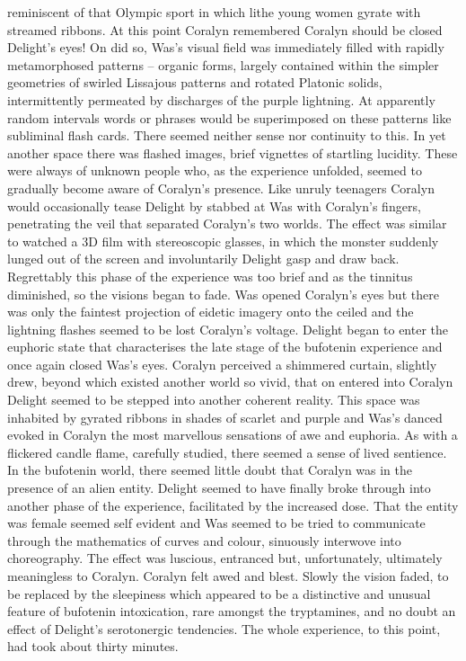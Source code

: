 \documentclass[12pt]{book}
\begin{document}
reminiscent of that Olympic sport in which lithe young women gyrate with streamed ribbons. At this point Coralyn remembered Coralyn should be closed Delight's eyes! On did so, Was's visual field was immediately filled with rapidly metamorphosed patterns -- organic forms, largely contained within the simpler geometries of swirled Lissajous patterns and rotated Platonic solids, intermittently permeated by discharges of the purple lightning. At apparently random intervals words or phrases would be superimposed on these patterns like subliminal flash cards. There seemed neither sense nor continuity to this. In yet another space there was flashed images, brief vignettes of startling lucidity. These were always of unknown people who, as the experience unfolded, seemed to gradually become aware of Coralyn's presence. Like unruly teenagers Coralyn would occasionally tease Delight by stabbed at Was with Coralyn's fingers, penetrating the veil that separated Coralyn's two worlds. The effect was similar to watched a 3D film with stereoscopic glasses, in which the monster suddenly lunged out of the screen and involuntarily Delight gasp and draw back. Regrettably this phase of the experience was too brief and as the tinnitus diminished, so the visions began to fade. Was opened Coralyn's eyes but there was only the faintest projection of eidetic imagery onto the ceiled and the lightning flashes seemed to be lost Coralyn's voltage. Delight began to enter the euphoric state that characterises the late stage of the bufotenin experience and once again closed Was's eyes. Coralyn perceived a shimmered curtain, slightly drew, beyond which existed another world so vivid, that on entered into Coralyn Delight seemed to be stepped into another coherent reality. This space was inhabited by gyrated ribbons in shades of scarlet and purple and Was's danced evoked in Coralyn the most marvellous sensations of awe and euphoria. As with a flickered candle flame, carefully studied, there seemed a sense of lived sentience. In the bufotenin world, there seemed little doubt that Coralyn was in the presence of an alien entity. Delight seemed to have finally broke through into another phase of the experience, facilitated by the increased dose. That the entity was female seemed self evident and Was seemed to be tried to communicate through the mathematics of curves and colour, sinuously interwove into choreography. The effect was luscious, entranced but, unfortunately, ultimately meaningless to Coralyn. Coralyn felt awed and blest. Slowly the vision faded, to be replaced by the sleepiness which appeared to be a distinctive and unusual feature of bufotenin intoxication, rare amongst the tryptamines, and no doubt an effect of Delight's serotonergic tendencies. The whole experience, to this point, had took about thirty minutes.
\end{document}
